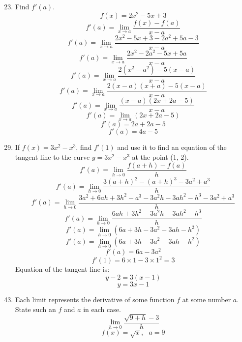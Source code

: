 \documentclass[12pt]{article}
\begin{document}
\begin{enumerate}
    \setcounter{enumi}{22}
    \item Find $f'(a)$.
          \[f(x) = 2x^2 - 5x + 3\]
          \[f'(a) = \lim_{x \to a} \frac{f(x) - f(a)}{x - a} \]
          \[f'(a) = \lim_{x \to a} \frac{2x^2 - 5x + 3 - 2a^2 + 5a - 3}{x - a} \]
          \[f'(a) = \lim_{x \to a} \frac{2x^2 - 2a^2 - 5x + 5a}{x - a} \]
          \[f'(a) = \lim_{x \to a} \frac{2(x^2 - a^2) - 5(x - a)}{x - a} \]
          \[f'(a) = \lim_{x \to a} \frac{2(x - a)(x + a) - 5(x - a)}{x - a} \]
          \[f'(a) = \lim_{x \to a} \frac{(x - a)(2x + 2a - 5)}{x - a} \]
          \[f'(a) = \lim_{x \to a} (2x + 2a - 5) \]
          \[f'(a) = 2a + 2a - 5 \]
          \[\boxed{f'(a) = 4a - 5}\]
\end{enumerate}

\begin{enumerate}
    \setcounter{enumi}{28}
    \item If $f(x) = 3x^2 - x^3$, find $f'(1)$ and use it to find an equation of the tangent line to the curve $y = 3x^2 - x^3$ at the point (1, 2).\\
          \[f'(a) = {\displaystyle \lim_{h \to 0} \frac{f(a+h) - f(a)}{h}}\]
          \[f'(a) = {\displaystyle \lim_{h \to 0} \frac{3(a+h)^2 - (a+h)^3 - 3a^2 + a^3}{h}}\]
          \[f'(a) = {\displaystyle \lim_{h \to 0} \frac{3a^2 + 6ah + 3h^2 - a^3 - 3a^2h - 3ah^2 - h^3 - 3a^2 + a^3}{h}}\]
          \[f'(a) = {\displaystyle \lim_{h \to 0} \frac{6ah + 3h^2 - 3a^2h - 3ah^2 - h^3}{h}}\]
          \[f'(a) = {\displaystyle \lim_{h \to 0} (6a + 3h - 3a^2 - 3ah - h^2)}\]
          \[f'(a) = {\displaystyle \lim_{h \to 0} (6a + 3h - 3a^2 - 3ah - h^2)}\]
          \[f'(a) = {\displaystyle 6a - 3a^2}\]
          \[f'(1) = {\displaystyle 6 \times 1 - 3 \times 1^2} = 3\]
          Equation of the tangent line is:
          \[y - 2 = 3(x - 1)\]
          \[\boxed{y = 3x -1}\]
\end{enumerate}

\begin{enumerate}
    \setcounter{enumi}{42}
    \item Each limit represents the derivative of some function $f$ at some number $a$. State such an $f$ and $a$ in each case.\\
          \[{\displaystyle \lim_{h \to 0} \frac{\sqrt{9+h} - 3}{h}}\]
          \[\boxed{f(x) = \sqrt{x}, \text{~ } a = 9}\]

\end{enumerate}
\end{document}
